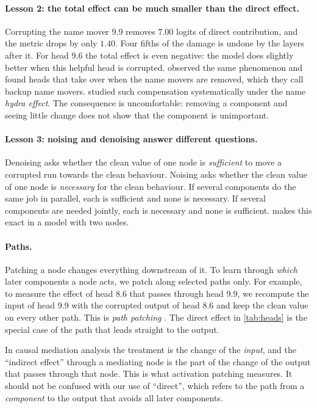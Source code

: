 \paragraph{Lesson 2: the total effect can be much smaller than the direct effect.} Corrupting the name mover 9.9
removes $7.00$ logits of direct contribution, and the metric drops by only $1.40$. Four fifths of the damage is
undone by the layers after it. For head 9.6 the total effect is even negative: the model does slightly better
when this helpful head is corrupted. \citet{wang2023interpretability} observed the same phenomenon and found
heads that take over when the name movers are removed, which they call backup name movers.
\citet{mcgrath2023hydra} studied such compensation systematically under the name \emph{hydra effect}. The
consequence is uncomfortable: removing a component and seeing little change does not show that the component
is unimportant.

\paragraph{Lesson 3: noising and denoising answer different questions.} Denoising asks whether the clean value
of one node is \emph{sufficient} to move a corrupted run towards the clean behaviour. Noising asks whether the
clean value of one node is \emph{necessary} for the clean behaviour. If several components do the same job in
parallel, each is sufficient and none is necessary. If several components are needed jointly, each is necessary
and none is sufficient.  makes this exact in a model with two nodes.

\paragraph{Paths.} Patching a node changes everything downstream of it. To learn through \emph{which} later
components a node acts, we patch along selected paths only. For example, to measure the effect of head 8.6
that passes through head 9.9, we recompute the input of head 9.9 with the corrupted output of head 8.6 and
keep the clean value on every other path. This is \emph{path patching}
\citep{wang2023interpretability,goldowskydill2023localizing}. The direct effect in \cref{tab:heads} is the
special case of the path that leads straight to the output.

\begin{remark}
In causal mediation analysis \citep{pearl2001direct,vig2020investigating} the treatment is the change of the
\emph{input}, and the ``indirect effect'' through a mediating node is the part of the change of the output that
passes through that node. This is what activation patching measures. It should not be confused with our use of
``direct'', which refers to the path from a \emph{component} to the output that avoids all later components.
\end{remark}

